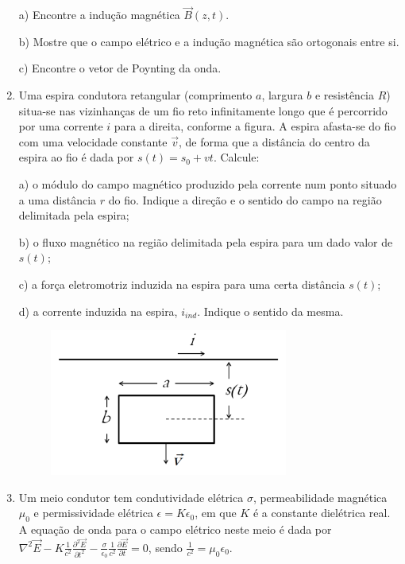 \begin{enumerate}[start=1,label={\bfseries Q\arabic*.}]
a) Encontre a indução magnética $\vec{B}(z,t)$.

\resposta

b) Mostre que o campo elétrico e a indução magnética são ortogonais entre si.

\resposta

c) Encontre o vetor de Poynting da onda.

\resposta


\item Uma espira condutora retangular (comprimento $a$, largura $b$ e resistência $R$) situa-se nas vizinhanças de um fio reto infinitamente longo que é percorrido por uma corrente $i$ para a direita, conforme a figura. A espira afasta-se do fio com uma velocidade constante $\vec{v}$, de forma que a distância do centro da espira ao fio é dada por $s(t) = s_{0} + vt$. Calcule:


a) o módulo do campo magnético produzido pela corrente num ponto situado a uma distância $r$ do fio. Indique a direção e o sentido do campo na região delimitada pela espira;

\resposta

b) o fluxo magnético na região delimitada pela espira para um dado valor de $s(t)$;

\resposta

c) a força eletromotriz induzida na espira para uma certa distância $s(t)$;

\resposta

d) a corrente induzida na espira, $i_{ind}$. Indique o sentido da mesma.

\begin{figure}[H]
\centering
\includegraphics[scale=1]{eletromag-img/espira2.png}
\end{figure}


\resposta


\item Um meio condutor tem condutividade elétrica $\sigma$, permeabilidade magnética $\mu_{0}$ e permissividade elétrica $\epsilon = K \epsilon_{0}$, em que $K$ é a constante dielétrica real. A equação de onda para o campo elétrico neste meio é dada por $\nabla^{2} \vec{E} - K \frac{1}{c^{2}} \frac{\partial^{2} \vec{E}}{\partial t^{2}} -  \frac{\sigma}{\epsilon_{0}} \frac{1}{c^{2}} \frac{\partial \vec{E}}{\partial t} = 0$, sendo $\frac{1}{c^{2}} = \mu_{0} \epsilon_{0}$.



\end{enumerate}
